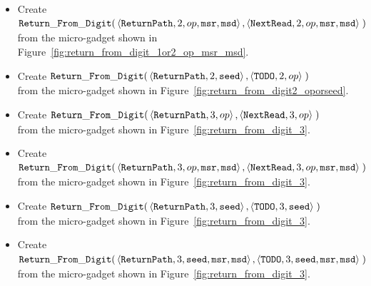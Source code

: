 \begin{itemize}
    \item Create
    $\begin{aligned}[t]
        {\tt Return\_From\_Digit}(& \left\langle {\tt ReturnPath},    2, op, {\tt msr}, {\tt msd} \right\rangle,
                           \left\langle {\tt NextRead}, 2, op, {\tt msr}, {\tt msd} \right\rangle \;)
    \end{aligned}$\\from the micro-gadget shown in Figure~\ref{fig:return_from_digit_1or2_op_msr_msd}.

    \item Create
    $\begin{aligned}[t]
        {\tt Return\_From\_Digit}(& \left\langle {\tt ReturnPath}, 2, {\tt seed} \right\rangle,
                           \left\langle {\tt TODO},  2, op \right\rangle \;)
    \end{aligned}$\\from the micro-gadget shown in Figure~\ref{fig:return_from_digit2_oporseed}.




    \item Create
    $\begin{aligned}[t]
        {\tt Return\_From\_Digit}(& \left\langle {\tt ReturnPath},    3, op \right\rangle,
                           \left\langle {\tt NextRead}, 3, op \right\rangle \;)
    \end{aligned}$\\from the micro-gadget shown in Figure~\ref{fig:return_from_digit_3}.

    \item Create
    $\begin{aligned}[t]
        {\tt Return\_From\_Digit}(& \left\langle {\tt ReturnPath},    3, op, {\tt msr}, {\tt msd} \right\rangle,
                           \left\langle {\tt NextRead}, 3, op, {\tt msr}, {\tt msd} \right\rangle \;)
    \end{aligned}$\\from the micro-gadget shown in Figure~\ref{fig:return_from_digit_3}.

    \item Create
    $\begin{aligned}[t]
        {\tt Return\_From\_Digit}(& \left\langle {\tt ReturnPath}, 3, {\tt seed} \right\rangle,
                           \left\langle {\tt TODO},  3, {\tt seed} \right\rangle \;)
    \end{aligned}$\\from the micro-gadget shown in Figure~\ref{fig:return_from_digit_3}.

    \item Create
    $\begin{aligned}[t]
        {\tt Return\_From\_Digit}(& \left\langle {\tt ReturnPath}, 3, {\tt seed}, {\tt msr}, {\tt msd} \right\rangle,
                           \left\langle {\tt TODO},  3, {\tt seed}, {\tt msr}, {\tt msd} \right\rangle \;)
    \end{aligned}$\\from the micro-gadget shown in Figure~\ref{fig:return_from_digit_3}.

\end{itemize}


